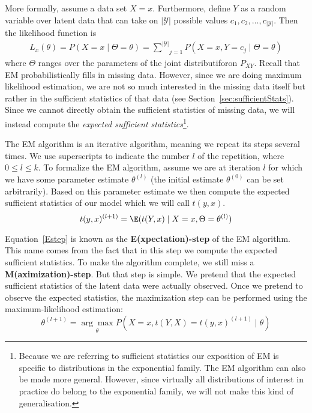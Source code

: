 More formally, assume a data set $ X=x $. Furthermore, define $ Y $ as a random variable over latent data that can
take on $ |\mathcal{Y}| $ possible values $c_1, c_2, \ldots, c_{|\mathcal{Y}|}$. Then the likelihood function is 
\begin{align}
L_{x}(\theta) = P(X=x \mid \Theta=\theta) = \underset{j=1}{\overset{|\mathcal{Y}|}{\sum}} P(X=x, Y=c_{j} \mid \Theta=\theta)
\end{align}
where $ \Theta $ ranges over the parameters of the joint distributiforon $ P_{XY} $. Recall that EM
probabilistically fills in missing data. However, since we are doing maximum likelihood estimation, we
are not so much interested in the missing data itself but rather in the sufficient statistics of
that data (see Section~\ref{sec:sufficientStats}). Since we cannot directly obtain the sufficient statistics
of missing data, we will instead compute the \textit{expected sufficient statistics}\footnote{
Because we are referring to sufficient statistics our exposition of EM is specific to distributions
in the exponential family. The EM algorithm can also be made more general. However, since virtually
all distributions of interest in practice do belong to the exponential family, we will not make this kind of generalisation.
}.

The EM algorithm is an iterative 
algorithm, meaning we repeat its steps several
times. We use superscripts to indicate the number $l$ of the repetition, where $ 0 \leq l \leq k $.
To formalize the EM algorithm, assume we are at iteration $l$ for which we have some parameter estimate 
$\theta^{(l)} $ (the initial estimate $\theta^{(0)}$ can be set arbitrarily). Based on this parameter 
estimate we then compute the expected sufficient statistics of our model which we will call $ t(y,x) $.
\begin{equation} \label{Estep}
t(y,x)^{(l+1)} = \E(t(Y,x) \mid X = x,\Theta = \theta^{(l)})
\end{equation} 

Equation~\eqref{Estep} is known as the \textbf{E(xpectation)-step} of the EM algorithm. This name
comes from the fact that in this step we compute the expected sufficient statistics. 
To make the algorithm complete, we still miss a
\textbf{M(aximization)-step}. But that step is simple. We pretend that the expected sufficient statistics of 
the latent data were actually observed. Once we pretend to observe the expected statistics, the maximization 
step can be performed using the maximum-likelihood estimation:
\begin{equation} \label{Mstep}
\theta^{(l+1)} = \underset{\theta}{\arg\max}  P(X=x, t(Y,X) = t(y,x)^{(l+1)} \mid \theta)
\end{equation}

